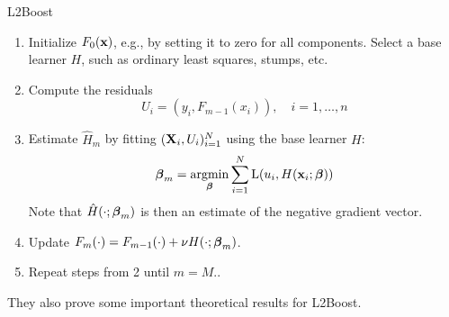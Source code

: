 \begin{algorithm}
\caption{L2Boost}
\label{algo:l2}
\begin{enumerate}
    \item Initialize $F_0(\mathbf{x})$, e.g., by setting it to zero for all components. Select a base learner $H$, such as ordinary least squares, stumps, etc.
    \item Compute the residuals
        \begin{equation*}
            U_i=(y_i,F_{m-1}(x_i)),\quad i=1,\dotsc,n
        \end{equation*}
    \item Estimate $\hat{H}_m$ by fitting $(\mathbf{X}_i,U_i)_{i=1}^N$ using the base learner $H$:
        \begin{equation*}
            \boldsymbol{\beta}_m=\operatorname*{argmin}_{\boldsymbol{\beta}}\sum_{i=1}^N\operatorname{L}(u_i,H(\mathbf{x}_i;\boldsymbol{\beta}))
        \end{equation*}
        Note that $\hat{H}(\cdot;\boldsymbol{\beta}_m)$ is then an estimate of the negative gradient vector.
    \item Update $F_m(\cdot)=F_{m-1}(\cdot)+\nu H(\cdot;\boldsymbol{\beta}_m)$.
    \item Repeat steps from 2 until $m=M$..
\end{enumerate}
\end{algorithm}

They also prove some important theoretical results for L2Boost.
